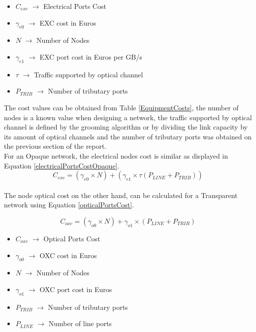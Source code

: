 	\begin{itemize}
		\item{$C_{exc}$		$\rightarrow$	Electrical Ports Cost}
		\item{$\gamma_{e0}$	$\rightarrow$	EXC cost in Euros}
		\item{$N$			$\rightarrow$	Number of Nodes}
		\item{$\gamma_{e1}$	$\rightarrow$	EXC port cost in Euros per GB/s}
		\item{$\tau$		$\rightarrow$	Traffic supported by optical channel}
		\item{$P_{TRIB}$	$\rightarrow$	Number of tributary ports}
	\end{itemize}
	
	The cost values can be obtained from Table \ref{EquipmentCosts}, the number of nodes is a known value when designing a network, the traffic supported by optical channel is defined by the grooming algorithm or by dividing the link capacity by its amount of optical channels and the number of tributary ports was obtained on the previous section of the report. \\
	
	For an Opaque network, the electrical nodes cost is similar as displayed in Equation \ref{electricalPortsCostOpaque}.\\
	
	\begin{equation}
	C_{exc} = \left(\gamma_{e0}\times N\right) + \left(\gamma_{e1} \times \tau \left(P_{LINE} + P_{TRIB}\right)\right)
	\label{electricalPortsCostOpaque}
	\end{equation}	\\
	
	The node optical cost on the other hand, can be calculated for a Transparent network using Equation \ref{opticalPortsCost}.
	
	\begin{equation}
		C_{oxc} = \left(\gamma_{o0} \times N \right) + \gamma_{o1} \times  \left(P_{LINE} + P_{TRIB}\right)
		\label{opticalPortsCost}
	\end{equation}	
	
	\begin{itemize}
		\item{$C_{oxc}$		$\rightarrow$	Optical Ports Cost}
		\item{$\gamma_{o0}$	$\rightarrow$	OXC cost in Euros}
		\item{$N$			$\rightarrow$	Number of Nodes}
		\item{$\gamma_{o1}$	$\rightarrow$	OXC port cost in Euros}
		\item{$P_{TRIB}	$	$\rightarrow$	Number of tributary ports}
		\item{$P_{LINE} $	$\rightarrow$	Number of line ports}
	\end{itemize}
		
